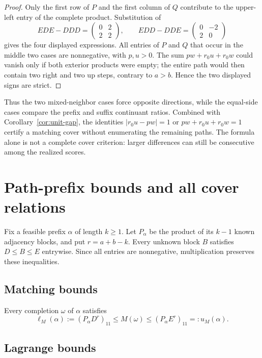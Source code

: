 \documentclass[11pt]{amsart}
\theoremstyle{definition}
\begin{document}
\begin{proof}
Only the first row of $P$ and the first column of $Q$ contribute to the
upper-left entry of the complete product.  Substitution of
\[
 EDE-DDD=\begin{pmatrix}0&2\\2&2\end{pmatrix},
 \qquad
 EDD-DDE=\begin{pmatrix}0&-2\\2&0\end{pmatrix}
\]
gives the four displayed expressions.  All entries of $P$ and $Q$ that occur
in the middle two cases are nonnegative, with $p,u>0$.  The sum
$pw+r_0u+r_0w$ could vanish only if both exterior products were empty; the
entire path would then contain two right and two up steps, contrary to
$a>b$.  Hence the two displayed signs are strict.
\end{proof}

Thus the two mixed-neighbor cases force opposite directions, while the
equal-side cases compare the prefix and suffix continuant ratios.  Combined
with Corollary~\ref{cor:unit-gap}, the identities
$|r_0u-pw|=1$ or $pw+r_0u+r_0w=1$ certify a matching cover without enumerating
the remaining paths.  The formula alone is not a complete cover criterion:
larger differences can still be consecutive among the realized scores.

\section{Path-prefix bounds and all cover relations}\label{sec:covers}

Fix a feasible prefix $\alpha$ of length $k\geq1$.  Let $P_\alpha$ be the
product of its $k-1$ known adjacency blocks, and put $r=a+b-k$.  Every unknown
block $B$ satisfies $D\leq B\leq E$ entrywise.  Since all entries are
nonnegative, multiplication preserves these inequalities.

\subsection{Matching bounds}

Every completion $\omega$ of $\alpha$ satisfies
\begin{equation}\label{eq:M-bounds}
 \ell_M(\alpha):=(P_\alpha D^r)_{11}
 \leq M(\omega)\leq
 (P_\alpha E^r)_{11}=:u_M(\alpha).
\end{equation}

\subsection{Lagrange bounds}
\end{document}
